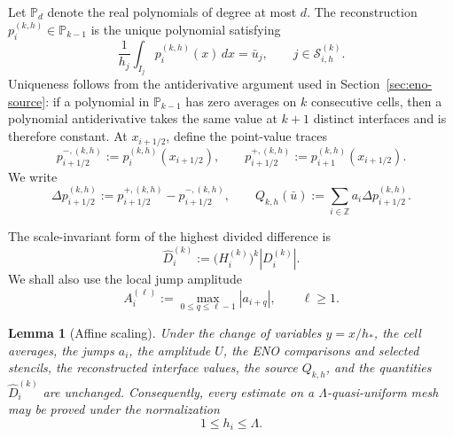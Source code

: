 \documentclass[11pt]{amsart}
\theoremstyle{plain}
\newtheorem{lemma}[theorem]{Lemma}
\theoremstyle{definition}
\theoremstyle{remark}
\numberwithin{equation}{section}
\theoremstyle{plain}
\begin{document}
Let $\mathbb P_d$ denote the real polynomials of degree at most $d$.  The
reconstruction $p_i^{(k,h)}\in\mathbb P_{k-1}$ is the unique polynomial
satisfying
\begin{equation}\label{eq:nonuniform-reconstruction}
	\frac1{h_j}\int_{I_j}p_i^{(k,h)}(x)\,dx=\bar u_j,
	\qquad
	j\in\mathcal S_{i,h}^{(k)}.
\end{equation}
Uniqueness follows from the antiderivative argument used in Section~\ref{sec:eno-source}:
if a polynomial in $\mathbb P_{k-1}$ has zero averages on $k$ consecutive
cells, then a polynomial antiderivative takes the same value at $k+1$ distinct
interfaces and is therefore constant.  At $x_{i+1/2}$, define the
point-value traces
\[
p_{i+1/2}^{-,(k,h)}
:=p_i^{(k,h)}(x_{i+1/2}),
\qquad
p_{i+1/2}^{+,(k,h)}
:=p_{i+1}^{(k,h)}(x_{i+1/2}).
\]
We write
\begin{equation}\label{eq:nonuniform-source}
	\Delta p_{i+1/2}^{(k,h)}
	:=p_{i+1/2}^{+,(k,h)}-p_{i+1/2}^{-,(k,h)},
	\qquad
	Q_{k,h}(\bar u)
	:=\sum_{i\in\mathbb Z}
	a_i\Delta p_{i+1/2}^{(k,h)}.
\end{equation}

The scale-invariant form of the highest divided difference is
\begin{equation}\label{eq:nonuniform-normalized-difference}
	\widehat D_i^{(k)}
	:=
	\bigl(H_i^{(k)}\bigr)^k|D_i^{(k)}|.
\end{equation}
We shall also use the local jump amplitude
\begin{equation}\label{eq:nonuniform-local-amplitude}
	A_i^{(\ell)}
	:=
	\max_{0\le q\le\ell-1}|a_{i+q}|,
	\qquad \ell\ge1.
\end{equation}

\begin{lemma}[Affine scaling]
	\label{lem:nonuniform-affine-scaling}
	Under the change of variables $y=x/h_*$, the cell averages, the jumps
	$a_i$, the amplitude $U$, the ENO comparisons and selected stencils, the
	reconstructed interface values, the source $Q_{k,h}$, and the quantities
	$\widehat D_i^{(k)}$ are unchanged.  Consequently, every estimate on a
	$\Lambda$-quasi-uniform mesh may be proved under the normalization
	\begin{equation}\label{eq:normalized-quasi-uniformity}
		1\le h_i\le\Lambda.
	\end{equation}
\end{lemma}
\end{document}
